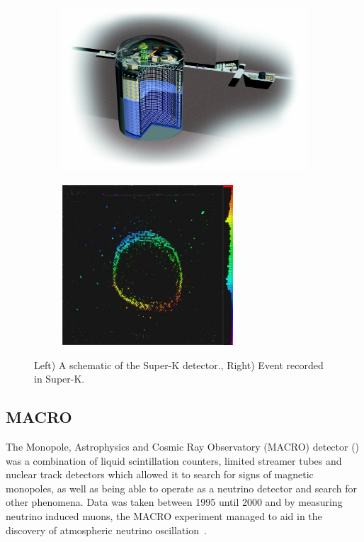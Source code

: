 \begin{figure}[h!]
\centering
\begin{subfigure}{.5\textwidth}
  \centering
\includegraphics[width=\textwidth]{figures/SK3D.jpg}
\vspace{2mm}
\end{subfigure}%
\begin{subfigure}{.5\textwidth}
  \centering
\includegraphics[width=0.7\textwidth]{figures/SuperKMuon-300x282.jpg}
\vspace{2mm}
\end{subfigure}
\vspace{2mm}
\caption{Left) A schematic of the Super-K detector., Right) Event recorded in Super-K.}
\label{fig:SK}
\end{figure}

\subsection{MACRO}
The Monopole, Astrophysics and Cosmic Ray Observatory (MACRO) detector () was a combination of liquid scintillation counters, limited streamer tubes and nuclear track detectors which allowed it to search for signs of magnetic monopoles, as well as being able to operate as a neutrino detector and search for other phenomena. Data was taken between 1995 until 2000 and by measuring neutrino induced muons, the MACRO experiment managed to aid in the discovery of atmospheric neutrino oscillation~\cite{62MACRO}.

